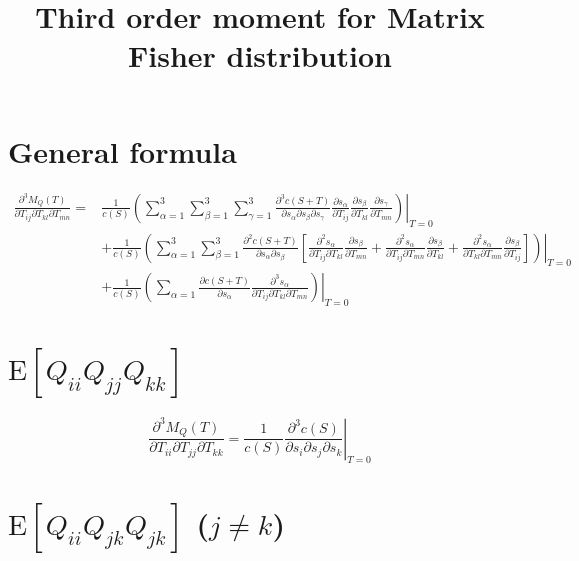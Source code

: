 \documentclass[10pt]{article}
\title{\vspace{-4ex}\textbf{Third order moment for Matrix Fisher distribution\vspace{-4ex}}}
\date{}
\newcommand{\expect}[1]{\ensuremath{\mathrm{E}\left[ #1 \right]}}
\begin{document}
\maketitle

\section{General formula}

\begin{align}
	\frac{\partial^3 M_Q(T)}{\partial T_{ij} \partial T_{kl} \partial T_{mn}} = &\frac{1}{c(S)}\left.\left( \sum_{\alpha=1}^{3}\sum_{\beta=1}^{3}\sum_{\gamma=1}^{3} \frac{\partial^3 c(S+T)}{\partial s_\alpha \partial s_\beta \partial s_\gamma} \frac{\partial s_\alpha}{\partial T_{ij}} \frac{\partial s_\beta}{\partial T_{kl}} \frac{\partial s_\gamma}{\partial T_{mn}} \right)\right|_{T=0} \nonumber \\ 
	&+ \frac{1}{c(S)} \left.\left( \sum_{\alpha=1}^3\sum_{\beta=1}^3 \frac{\partial^2 c(S+T)}{\partial s_\alpha \partial s_\beta } \left[ \frac{\partial^2 s_\alpha}{\partial T_{ij} \partial T_{kl}} \frac{\partial s_\beta}{\partial T_{mn}} + \frac{\partial^2 s_\alpha}{\partial T_{ij} \partial T_{mn}} \frac{\partial s_\beta}{\partial T_{kl}} + \frac{\partial^2 s_\alpha}{\partial T_{kl} \partial T_{mn}} \frac{\partial s_\beta}{\partial T_{ij}} \right] \right)\right|_{T=0} \nonumber \\
	&+\frac{1}{c(S)} \left.\left( \sum_{\alpha=1} \frac{\partial c(S+T)}{\partial s_\alpha}\frac{\partial^3 s_\alpha}{\partial T_{ij} \partial T_{kl} \partial T_{mn}} \right)\right|_{T=0}
\end{align}

\section{$\expect{Q_{ii}Q_{jj}Q_{kk}}$}

\begin{equation}
	\frac{\partial^3 M_Q(T)}{\partial T_{ii} \partial T_{jj} \partial T_{kk}} = \frac{1}{c(S)} \left. \frac{\partial^3 c(S)}{\partial s_i \partial s_j \partial s_k} \right|_{T=0}
\end{equation}

\section{$\expect{Q_{ii}Q_{jk}Q_{jk}}$ ($j\neq k$)}
\end{document}

